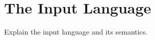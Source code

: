 \section{The Input Language}
\label{sec:input-language}

Explain the input language and its semantics.


